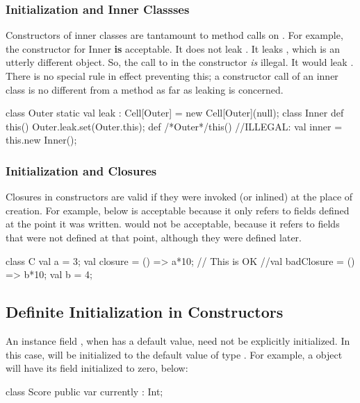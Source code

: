 \subsubsection{Initialization and Inner Classses}

Constructors of inner classes are tantamount to method calls on .  
For example, the constructor for Inner {\bf is} acceptable.  It does not leak
.  It leaks , which is an utterly different object.  
So, the call to  in the  constructor {\em
is} illegal.  It would leak .  There is no special rule in effect
preventing this; a constructor call of an inner class is no 
different from a method as far as leaking is concerned.
\begin{xten}
class Outer {
  static val leak : Cell[Outer] = new Cell[Outer](null);
  class Inner {
     def this() {Outer.leak.set(Outer.this);}
  }
  def /*Outer*/this() {
     //ILLEGAL: val inner = this.new Inner(); 
  }
}
\end{xten}
%



\subsubsection{Initialization and Closures}

Closures in constructors are valid if they were invoked (or inlined) at the
place of creation. For example,  below is acceptable because it
only refers to fields defined at the point it was written.  
would not be acceptable, because it refers to fields that were not defined at
that point, although they were defined later.
\begin{xten}
class C {
  val a = 3;
  val closure = () => a*10; // This is OK
  //val badClosure = () => b*10; 
  val b = 4;
}
\end{xten}
%


\subsection{Definite Initialization in Constructors}


An instance field , when  has a default value, need not be
explicitly initialized.  In this case,  will be initialized to the
default value of type .  For example, a  object will have
its  field initialized to zero, below:
\begin{xten}
class Score {
  public var currently : Int;
}
\end{xten}
%

